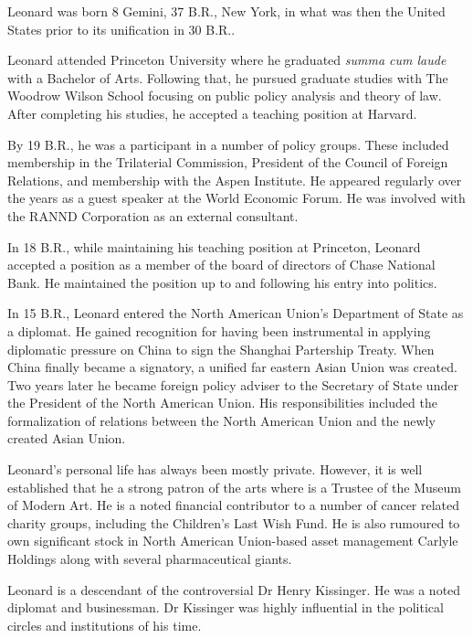 
Leonard was born 8 Gemini, 37 B.R., New York, in what was then the United States prior to its unification in 30 B.R..

Leonard attended Princeton University where he graduated {\it summa cum laude} with a Bachelor of Arts. Following that, he pursued graduate studies with The Woodrow Wilson School focusing on public policy analysis and theory of law. After completing his studies, he accepted a teaching position at Harvard.

By 19 B.R., he was a participant in a number of policy groups. These included membership in the Trilaterial Commission, President of the Council of Foreign Relations, and membership with the Aspen Institute. He appeared regularly over the years as a guest speaker at the World Economic Forum. He was involved with the RANND Corporation as an external consultant. 

In 18 B.R., while maintaining his teaching position at Princeton, Leonard accepted a position as a member of the board of directors of Chase National Bank. He maintained the position up to and following his entry into politics.

In 15 B.R., Leonard entered the North American Union's Department of State as a diplomat. He gained recognition for having been instrumental in applying diplomatic pressure on China to sign the Shanghai Partership Treaty. When China finally became a signatory, a unified far eastern Asian Union was created. Two years later he became foreign policy adviser to the Secretary of State under the President of the North American Union. His responsibilities included the formalization of relations between the North American Union and the newly created Asian Union.

Leonard's personal life has always been mostly private. However, it is well established that he a strong patron of the arts where is a Trustee of the Museum of Modern Art. He is a noted financial contributor to a number of cancer related charity groups, including the Children's Last Wish Fund. He is also rumoured to own significant stock in North American Union-based asset management Carlyle Holdings along with several pharmaceutical giants.

Leonard is a descendant of the controversial Dr Henry Kissinger. He was a noted diplomat and businessman. Dr Kissinger was highly influential in the political circles and institutions of his time.

